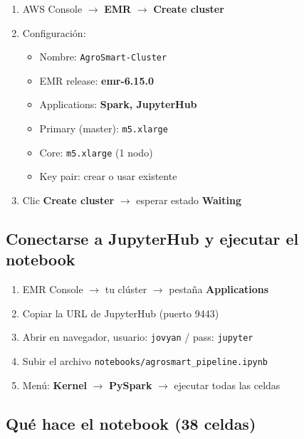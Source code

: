 \documentclass[11pt,a4paper]{article}
\begin{document}
\begin{awsbox}
\begin{enumerate}
  \item AWS Console $\to$ \textbf{EMR} $\to$ \textbf{Create cluster}
  \item Configuraci\'on:
  \begin{itemize}
    \item Nombre: \texttt{AgroSmart-Cluster}
    \item EMR release: \textbf{emr-6.15.0}
    \item Applications: \textbf{Spark, JupyterHub}
    \item Primary (master): \texttt{m5.xlarge}
    \item Core: \texttt{m5.xlarge} (1 nodo)
    \item Key pair: crear o usar existente
  \end{itemize}
  \item Clic \textbf{Create cluster} $\to$ esperar estado \textbf{Waiting}
\end{enumerate}
\end{awsbox}

\subsection{Conectarse a JupyterHub y ejecutar el notebook}

\begin{awsbox}
\begin{enumerate}
  \item EMR Console $\to$ tu cl\'uster $\to$ pesta\~na \textbf{Applications}
  \item Copiar la URL de JupyterHub (puerto 9443)
  \item Abrir en navegador, usuario: \texttt{jovyan} / pass: \texttt{jupyter}
  \item Subir el archivo \texttt{notebooks/agrosmart\_pipeline.ipynb}
  \item Men\'u: \textbf{Kernel} $\to$ \textbf{PySpark} $\to$ ejecutar todas las celdas
\end{enumerate}
\end{awsbox}

\subsection{Qu\'e hace el notebook (38 celdas)}
\end{document}
